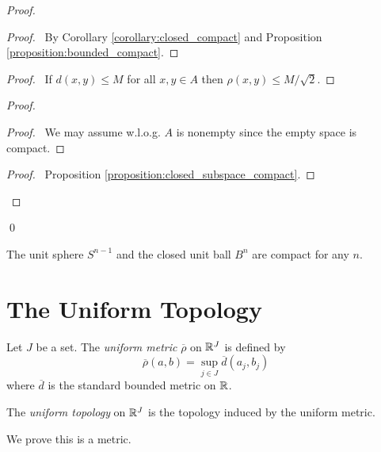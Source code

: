 \begin{proof}
    \pf
    \begin{proof}
        \pf\ By Corollary \ref{corollary:closed_compact} and Proposition \ref{proposition:bounded_compact}.
    \end{proof}
    \begin{proof}
        \pf\ If $d(x,y) \leq M$ for all $x,y \in A$ then $\rho(x,y) \leq M / \sqrt{2}$.
    \end{proof}
    \begin{proof}
        \begin{proof}
            \pf\ We may assume w.l.o.g. $A$ is nonempty since the empty space is compact.
        \end{proof}
        \begin{proof}
            \pf\ Proposition \ref{proposition:closed_subspace_compact}.
        \end{proof}
    \end{proof}
    \qed
\end{proof}

\begin{corollary}
    The unit sphere $S^{n-1}$ and the closed unit ball $B^n$ are compact for any $n$.
\end{corollary}

\section{The Uniform Topology}

\begin{definition}
    Let $J$ be a set. The \emph{uniform metric} $\overline{\rho}$ on $\mathbb{R}^J$ is defined by
    \[ \overline{\rho}(a,b) = \sup_{j \in J} \overline{d}(a_j, b_j) \]
    where $\overline{d}$ is the standard bounded metric on $\mathbb{R}$.

    The \emph{uniform topology} on $\mathbb{R}^J$ is the topology induced by the uniform metric.
\end{definition}

We prove this is a metric.

